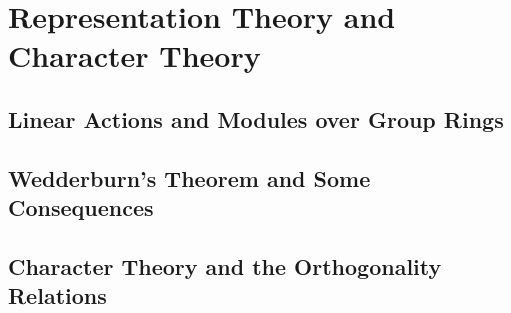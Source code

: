 \chapter{Representation Theory and Character Theory}

\section{Linear Actions and Modules over Group Rings}

\section{Wedderburn's Theorem and Some Consequences}

\section{Character Theory and the Orthogonality Relations}
